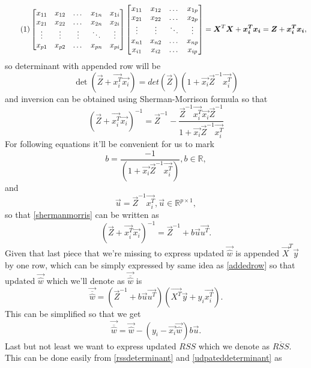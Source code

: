 \[ \numberthis \label{addedrow}
\begin{bmatrix}
	x_{11} & x_{12} & \dots  & x_{1n} & x_{1i}  \\
	x_{21} & x_{22} & \dots  & x_{2n} & x_{2i} \\
	\vdots & \vdots & \vdots & \ddots & \vdots \\
	x_{p1} & x_{p2} & \dots  & x_{pn} & x_{pi} 	
\end{bmatrix}
\begin{bmatrix}
	x_{11} & x_{12}  & \dots  & x_{1p} \\
	x_{21} & x_{22}  & \dots  & x_{2p} \\
	\vdots  & \vdots & \ddots & \vdots \\
	x_{n1} & x_{n2}  & \dots  & x_{np} \\
	x_{i1} & x_{i2}  & \dots  & x_{ip}
\end{bmatrix}
 = \vec{X}^T\vec{X} + \vec{x_i^T}\vec{x_i} = \vec{Z} + \vec{x_i^T}\vec{x_i},
\]
so determinant with appended row will be
\begin{equation} \label{udpateddeterminant}
	\det(\vec{Z} + \vec{x_i^T}\vec{x_i}) = det(\vec{Z})(1 + \vec{x_i}\vec{Z}^{-1}\vec{x_i^T})
\end{equation}
and inversion can be obtained using Sherman-Morrison formula \cite{bartlett1951inverse} so that 
\begin{equation} \label{shermanmorris}
	(\vec{Z} + \vec{x_i^T}\vec{x_i})^{-1} = \vec{Z}^{-1} - \dfrac{\vec{Z}^{-1}\vec{x_i^T}\vec{x_i}\vec{Z}^{-1}}{1 + \vec{x_i}\vec{Z}^{-1}\vec{x_i^T}}
\end{equation}
For following equations it'll be convenient for us to mark 
\begin{equation}
	b = \dfrac{-1}{(1 + \vec{x_i}\vec{Z}^{-1}\vec{x_i^T})},  b \in \mathbb{R},
\end{equation}
and 
\begin{equation} \label{agullo_u}
	\vec{u} = \vec{Z}^{-1}\vec{x_i^T},  	\vec{u} \in \mathbb{R}^{p \times 1},
\end{equation}
so that \ref{shermanmorris} can be written as
\begin{equation} \label{inversionplus}
	(\vec{Z} + \vec{x_i^T}\vec{x_i})^{-1} = \vec{Z}^{-1} + b\vec{u}\vec{u^T}.
\end{equation}
Given that last piece that we're missing to express updated $\vec{\hat{w}}$ is appended $\vec{X}^T\vec{y}$ by one row, which can be simply expressed by same idea as \ref{addedrow} so that updated $\vec{\hat{w}}$ which we'll denote as $\vec{\overline{\hat{w}}}$ is 
\begin{equation}
	\vec{\overline{\hat{w}}} = (\vec{Z}^{-1} + b\vec{u}\vec{u^T})(\vec{X^T}\vec{y} + y_i\vec{x_i^T}).
\end{equation}
This can be simplified so that we get
\begin{equation} \label{thetaplus}
	\vec{\overline{\hat{w}}} = \vec{\hat{w}} - (y_i - \vec{x_i}\vec{\hat{w}})b\vec{u}.
\end{equation}
Last but not least we want to express updated $RSS$ which we denote as $\overline{RSS}$. This can be done easily from \ref{rssdeterminant} and \ref{udpateddeterminant} as 

